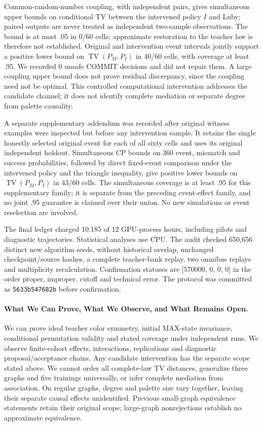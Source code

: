 Common-random-number coupling, with independent pairs, gives simultaneous
upper bounds on conditional TV between the intervened policy $I$ and Luby;
paired outputs are never treated as independent two-sample observations.
The bound is at most .05 in 0/60 cells; approximate
restoration to the teacher law is therefore not established.
Original and intervention event intervals jointly support a positive
lower bound on $\operatorname{TV}(P_M,P_I)$ in
40/60 cells, with coverage at least .95.
We recorded 0 unsafe COMMIT decisions and did not repair them.
A large coupling upper bound does not prove residual discrepancy, since
the coupling need not be optimal. This controlled computational intervention
addresses the candidate channel; it does not identify complete mediation
or separate degree from palette causality.

A separate supplementary addendum was recorded after original witness
examples were inspected but before any intervention sample. It retains the
single honestly selected original event for each of all sixty cells and
uses its original independent holdout. Simultaneous CP bounds on 360 event,
mismatch and success probabilities, followed by direct fixed-event comparison
under the intervened policy and the triangle inequality,
give positive lower bounds on $\operatorname{TV}(P_M,P_I)$ in
43/60 cells. The simultaneous
coverage is at least .95 for this supplementary family; it is separate from
the preceding event-effect family, and no joint .95 guarantee is claimed
over their union. No new simulations or event reselection are involved.

The final ledger charged 10.185 of 12 GPU-process hours,
including pilots and diagnostic trajectories. Statistical analyses use CPU.
The audit checked 650,656 distinct new algorithm seeds,
without historical overlap, unchanged checkpoint/source hashes, a complete
teacher-bank replay, two omnibus replays and multiplicity recalculation.
Confirmation statuses are [570000, 0, 0, 0] in the order proper,
improper, cutoff and technical error. The protocol was committed as
\texttt{5633b547682b} before confirmation.

\paragraph{What We Can Prove, What We Observe, and What Remains Open.}
We can prove ideal teacher color symmetry, initial MAX-state invariance,
conditional permutation validity and stated coverage under independent runs.
We observe finite-cohort effects, interactions, replications and diagnostic
proposal/acceptance chains. Any candidate intervention has the separate
scope stated above. We cannot order all complete-law TV distances, generalize
three graphs and five trainings universally, or infer complete mediation
from association. On regular graphs, degree and palette size vary
together, leaving their separate causal effects unidentified. Previous
small-graph equivalence statements retain their original scope; large-graph
nonrejections establish no approximate equivalence.

